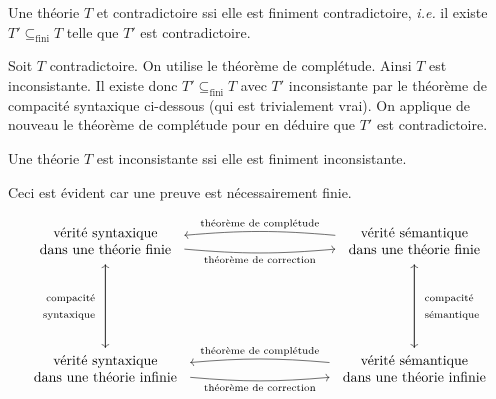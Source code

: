 \documentclass[./main]{subfiles}
\begin{document}
  \begin{thm}
    Une théorie $T$ et contradictoire ssi elle est finiment contradictoire, \textit{i.e.} il existe $T' \subseteq_\mathrm{fini} T$ telle que $T'$ est contradictoire.
  \end{thm}
  \begin{prv}
    Soit $T$ contradictoire.
    On utilise le théorème de complétude.
    Ainsi $T$ est inconsistante.
    Il existe donc $T' \subseteq_\mathrm{fini} T$ avec $T'$ inconsistante par le théorème de compacité syntaxique ci-dessous (qui est trivialement vrai).
    On applique de nouveau le théorème de complétude pour en déduire que $T'$ est contradictoire.
  \end{prv}

  \begin{thm}
    Une théorie $T$ est inconsistante ssi elle est finiment inconsistante.
  \end{thm}
  \begin{prv}
    Ceci est évident car une preuve est nécessairement finie.
  \end{prv}

  \vspace{-2\baselineskip}

  \[
  \begin{tikzcd}[column sep=100, row sep=60]
    \begin{array}{c}
      \text{vérité syntaxique}\\
      \text{dans une théorie finie}
    \end{array}
    \arrow[swap]{d}{\begin{array}{r}\text{compacité}\\\text{syntaxique}\end{array}}
    \arrow[bend right=5,swap]{r}{\text{théorème de correction}}&
    \arrow[bend right=5,swap]{l}{\text{théorème de complétude}}
    \begin{array}{c}
      \text{vérité sémantique}\\
      \text{dans une théorie finie}
    \end{array}
    \arrow{d}{\begin{array}{l}\text{compacité}\\\text{sémantique}\end{array}}\\
    \arrow{u}{}
    \begin{array}{c}
      \text{vérité syntaxique}\\
      \text{dans une théorie infinie}
    \end{array}
    \arrow[bend right=5,swap]{r}{\text{théorème de correction}}&
    \arrow[bend right=5,swap]{l}{\text{théorème de complétude}}
    \begin{array}{c}
      \text{vérité sémantique}\\
      \text{dans une théorie infinie}
    \end{array}
    \arrow{u}{}
  \end{tikzcd}
  \] 
\end{document}
